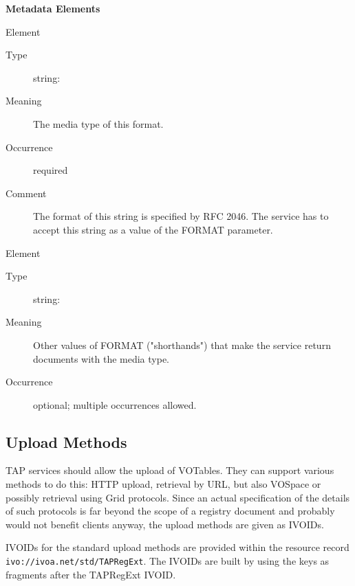\documentclass{ivoa}
\begin{document}
\vspace{0.5ex}\noindent\textbf{ Metadata Elements}

\begingroup\small\begin{bigdescription}\item[Element \xmlel{mime}]
\begin{description}
\item[Type] string: 
\item[Meaning] 
          The media type of this format.
          
\item[Occurrence] required
\item[Comment] 
          The format of this string is specified by RFC 2046.
          The service has to accept this string as a 
          value of the FORMAT parameter.
          

\end{description}
\item[Element \xmlel{alias}]
\begin{description}
\item[Type] string: 
\item[Meaning] 
          Other values of FORMAT ("shorthands") that make the service return 
          documents with the media type.
          
\item[Occurrence] optional; multiple occurrences allowed.

\end{description}


\end{bigdescription}\endgroup

\endgroup

\subsection{Upload Methods}

\label{uploadmethods}

TAP services should allow the upload of VOTables.  They can support
various methods to do this: HTTP upload, retrieval by URL, but also VOSpace
or possibly retrieval using Grid protocols.  Since an actual specification
of the details of such protocols is far beyond the scope of a registry
document and probably would not benefit clients anyway, the upload
methods are given as IVOIDs.

IVOIDs for the standard upload methods are provided within the
resource record
\texttt{ivo://ivoa.net/std/TAPRegExt}.  
The IVOIDs are built by using the keys as fragments after the 
TAPRegExt IVOID.
\end{document}

